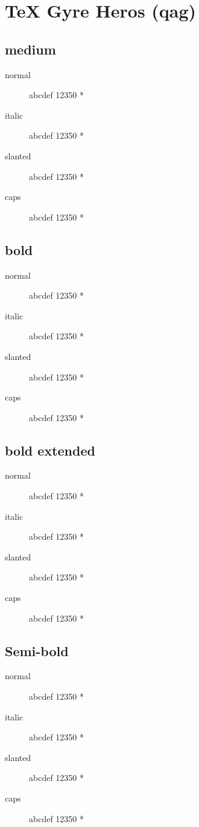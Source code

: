 \section{\TeX{} Gyre Heros (qag)}

\subsection{medium}
\begin{description}
    \item [normal]  abcdef 12350 *
    \item [italic]  abcdef 12350 *
    \item [slanted]  abcdef 12350 *
    \item [caps]  abcdef 12350 *
\end{description}
    
\subsection{bold}
\begin{description}
    \item [normal]  abcdef 12350 *
    \item [italic]  abcdef 12350 *
    \item [slanted]  abcdef 12350 *
    \item [caps]  abcdef 12350 *
\end{description}
    
\subsection{bold extended}
\begin{description}
    \item [normal]  abcdef 12350 *
    \item [italic]  abcdef 12350 *
    \item [slanted]  abcdef 12350 *
    \item [caps]  abcdef 12350 *
\end{description}

\subsection{Semi-bold}
\begin{description}
    \item [normal]  abcdef 12350 *
    \item [italic]  abcdef 12350 *
    \item [slanted]  abcdef 12350 *
    \item [caps]  abcdef 12350 *
\end{description}

